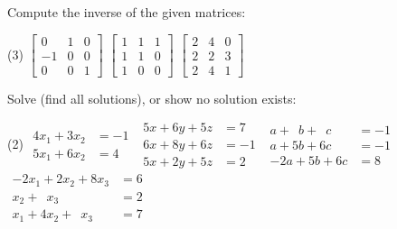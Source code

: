 \begin{exercise}
Compute the inverse of the given matrices:
\begin{tasks}(3)
\task
$\begin{bmatrix}
0 & 1 & 0 \\
-1 & 0 & 0 \\
0 & 0 & 1
\end{bmatrix}$
\task
$\begin{bmatrix}
1 & 1 & 1 \\
1 & 1 & 0 \\
1 & 0 & 0
\end{bmatrix}$
\task
$\begin{bmatrix}
2 & 4 & 0 \\
2 & 2 & 3 \\
2 & 4 & 1
\end{bmatrix}$
\end{tasks}
\end{exercise}

\begin{exercise}
Solve (find all solutions), or show no solution exists:
\begin{tasks}(2)
\task
$\begin{aligned}
4x_1+3x_2 & = -1 \\
5x_1+6x_2 & = 4
\end{aligned}$
\task
$\begin{aligned}
 5x+6y+5z & = 7 \\
 6x+8y+6z & = -1 \\
 5x+2y+5z & = 2
\end{aligned}$
\task
$\begin{aligned}
a+\phantom{5}b+\phantom{6}c & = -1 \\
a+5b+6c & = -1 \\
-2a+5b+6c & = 8
\end{aligned}$
\task
$\begin{aligned}
-2 x_1+2x_2+8x_3 & = 6 \\
x_2+\phantom{8}x_3 & = 2 \\
x_1+4x_2+\phantom{8}x_3 & = 7
\end{aligned}$
\end{tasks}
\end{exercise}

